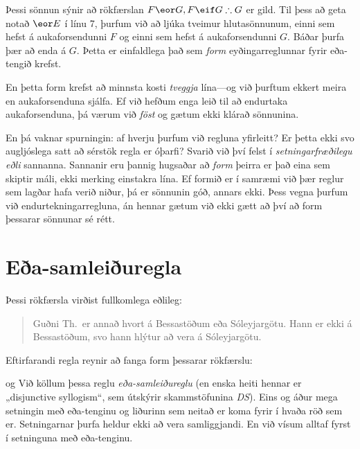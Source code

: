 Þessi sönnun sýnir að rökfærslan $F \eor G, F \eif G \therefore G$ er gild. Til þess að geta notað $\eor E$ í línu 7, þurfum við að ljúka tveimur hlutasönnunum, einni sem hefst á aukaforsendunni $F$ og einni sem hefst á aukaforsendunni $G$. Báðar þurfa þær að enda á $G$. Þetta er einfaldlega það sem \emph{form} eyðingarreglunnar fyrir eða-tengið krefst.

En þetta form krefst að minnsta kosti \emph{tveggja} lína---og við þurftum ekkert meira en aukaforsenduna sjálfa. Ef við hefðum enga leið til að endurtaka aukaforsenduna, þá værum við \emph{föst} og gætum ekki klárað sönnunina. 

En þá vaknar spurningin: af hverju þurfum við regluna yfirleitt? Er þetta ekki svo augljóslega satt að sérstök regla er óþarfi? Svarið við því felst í \emph{setningarfræðilegu eðli} sannanna. Sannanir eru þannig hugsaðar að \emph{form} þeirra er það eina sem skiptir máli, ekki merking einstakra lína. Ef formið er í samræmi við þær reglur sem lagðar hafa verið niður, þá er sönnunin góð, annars ekki. Þess vegna þurfum við endurtekningarregluna, án hennar gætum við ekki gætt að því að form þessarar sönnunar sé rétt.


\section{Eða-samleiðuregla}

Þessi rökfærsla virðist fullkomlega eðlileg:
	\begin{quote}
		Guðni Th.\ er annað hvort á Bessastöðum eða Sóleyjargötu. Hann er ekki á Bessastöðum, svo hann hlýtur að vera á Sóleyjargötu.
	\end{quote}
Eftirfarandi regla reynir að fanga form þessarar rökfærslu:

og
Við köllum þessa reglu \emph{eða-samleiðureglu} (en enska heiti hennar er „disjunctive syllogism“, sem útskýrir skammstöfunina \emph{DS}). Eins og áður mega setningin með eða-tenginu og liðurinn sem neitað er koma fyrir í hvaða röð sem er. Setningarnar þurfa heldur ekki að vera samliggjandi. En við vísum alltaf fyrst í setninguna með eða-tenginu.


